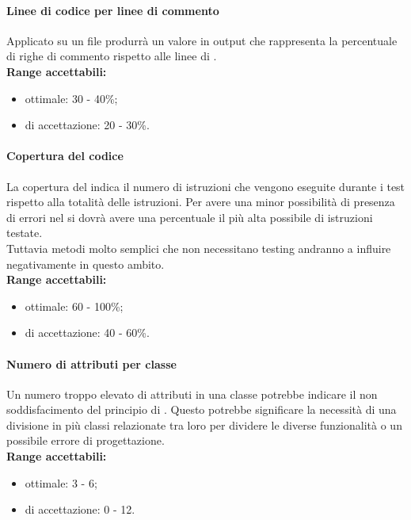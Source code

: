 \documentclass{scalatekids-article}
\begin{document}
\paragraph{Linee di codice per linee di commento}
Applicato su un file produrrà un valore in output che rappresenta la percentuale di righe di commento rispetto alle linee di .\\
\textbf{Range accettabili:}
\begin{itemize}
  \item {} ottimale: 30 - 40\%;
  \item {} di accettazione: 20 - 30\%.
\end{itemize}

\paragraph{Copertura del codice}
La copertura del  indica il numero di istruzioni che vengono eseguite durante i test rispetto alla totalità delle istruzioni. Per avere una minor possibilità di presenza di errori nel  si dovrà avere una percentuale il più alta possibile di istruzioni testate.\\Tuttavia metodi molto semplici che non necessitano testing andranno a influire negativamente in questo ambito.\\
\textbf{Range accettabili:}
\begin{itemize}
  \item {} ottimale: 60 - 100\%;
  \item {} di accettazione: 40 - 60\%.
\end{itemize}

\paragraph{Numero di attributi per classe}
Un numero troppo elevato di attributi in una classe potrebbe indicare il non soddisfacimento del principio di \textit{}. Questo potrebbe significare la necessità di una divisione in più classi relazionate tra loro per dividere le diverse funzionalità o un possibile errore di progettazione.\\
\textbf{Range accettabili:}
\begin{itemize}
  \item {} ottimale: 3 - 6;
  \item {} di accettazione: 0 - 12.
\end{itemize}
\end{document}
